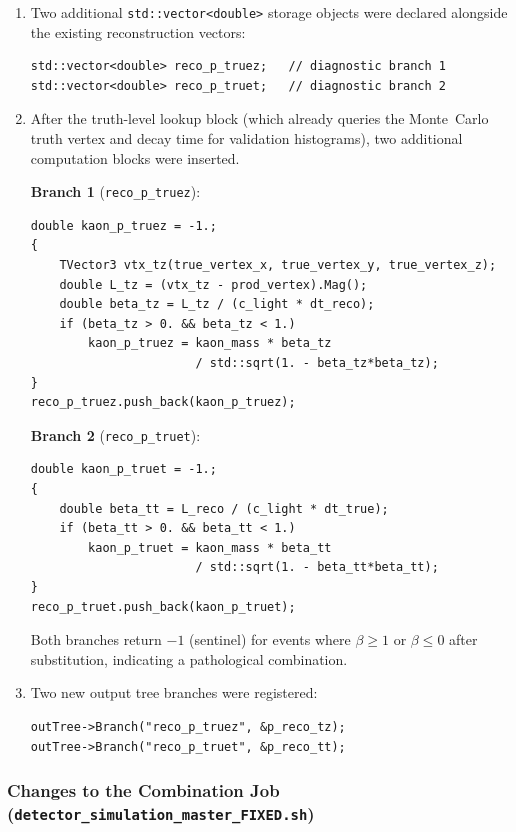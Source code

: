 \begin{enumerate}
  \item Two additional \texttt{std::vector<double>} storage objects were declared
        alongside the existing reconstruction vectors:
\begin{verbatim}
std::vector<double> reco_p_truez;   // diagnostic branch 1
std::vector<double> reco_p_truet;   // diagnostic branch 2
\end{verbatim}

  \item After the truth-level lookup block (which already queries the Monte~Carlo
        truth vertex and decay time for validation histograms), two additional
        computation blocks were inserted.

        \textbf{Branch 1} (\texttt{reco\_p\_truez}):
\begin{verbatim}
double kaon_p_truez = -1.;
{
    TVector3 vtx_tz(true_vertex_x, true_vertex_y, true_vertex_z);
    double L_tz = (vtx_tz - prod_vertex).Mag();
    double beta_tz = L_tz / (c_light * dt_reco);
    if (beta_tz > 0. && beta_tz < 1.)
        kaon_p_truez = kaon_mass * beta_tz
                       / std::sqrt(1. - beta_tz*beta_tz);
}
reco_p_truez.push_back(kaon_p_truez);
\end{verbatim}

        \textbf{Branch 2} (\texttt{reco\_p\_truet}):
\begin{verbatim}
double kaon_p_truet = -1.;
{
    double beta_tt = L_reco / (c_light * dt_true);
    if (beta_tt > 0. && beta_tt < 1.)
        kaon_p_truet = kaon_mass * beta_tt
                       / std::sqrt(1. - beta_tt*beta_tt);
}
reco_p_truet.push_back(kaon_p_truet);
\end{verbatim}

        Both branches return $-1$ (sentinel) for events where $\beta \geq 1$ or
        $\beta \leq 0$ after substitution, indicating a pathological combination.

  \item Two new output tree branches were registered:
\begin{verbatim}
outTree->Branch("reco_p_truez", &p_reco_tz);
outTree->Branch("reco_p_truet", &p_reco_tt);
\end{verbatim}
\end{enumerate}

\subsubsection{Changes to the Combination Job (\texttt{detector\_simulation\_master\_FIXED.sh})}


